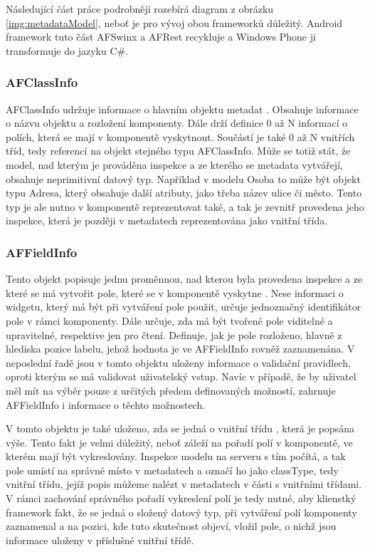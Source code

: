 Následující část práce podrobněji rozebírá diagram z obrázku \ref{img:metadataModel}, neboť je pro vývoj obou frameworků důležitý. Android framework tuto část AFSwinx a AFRest recykluje a Windows Phone ji transformuje do jazyku C\#.
\subsubsection{AFClassInfo}
AFClassInfo udržuje informace o hlavním objektu metadat \cite{tomasek-thesis}. Obsahuje informace o názvu objektu a rozložení komponenty. Dále drží definice 0 až N informací o polích, která se mají v komponentě vyskytnout. Součástí je také 0 až N vnitřích tříd, tedy referencí na objekt stejného typu AFClassInfo. Může se totiž stát, že model, nad kterým je prováděna inspekce a ze kterého se metadata vytvářejí, obsahuje neprimitivní datový typ. Například v modelu Osoba to může být objekt typu Adresa, který obsahuje další atributy, jako třeba název ulice či město. Tento typ je ale nutno v komponentě reprezentovat také, a tak je zevnitř provedena jeho inspekce, která je později v metadatech reprezentována jako vnitřní třída. 

\subsubsection{AFFieldInfo}
Tento objekt popisuje jednu proměnnou, nad kterou byla provedena inspekce a ze které se má vytvořit pole, které se v komponentě vyskytne \cite{tomasek-thesis}. Nese informaci o widgetu, který má být při vytváření pole použit, určuje jednoznačný identifikátor pole v rámci komponenty. Dále určuje, zda má být tvořené pole viditelné a upravitelné, respektive jen pro čtení. Definuje, jak je pole rozloženo, hlavně z hlediska pozice labelu, jehož hodnota je ve AFFieldInfo rovněž zaznamenána. V neposlední řadě jsou v tomto objektu uloženy informace o validační pravidlech, oproti kterým se má validovat uživatelský vstup. Navíc v případě, že by uživatel měl mít na výběr pouze z určitých předem definovaných možností, zahrnuje AFFieldInfo i informace o těchto možnostech. 

V tomto objektu je také uloženo, zda se jedná o vnitřní třídu \cite{tomasek-thesis}, která je popsána výše. Tento fakt je velmi důležitý, neboť záleží na pořadí polí v komponentě, ve kterém mají být vykreslovány. Inspekce modelu na serveru s tím počítá, a tak pole umístí na správné místo v metadatech a označí ho jako classType, tedy vnitřní třídu, jejíž popis můžeme nalézt v metadatech v části s vnitřními třídami. V rámci zachování správného pořadí vykreslení polí je tedy nutné, aby klienstký framework fakt, že se jedná o složený datový typ, při vytváření polí komponenty zaznamenal a na pozici, kde tuto skutečnost objeví, vložil pole, o nichž jsou informace uloženy v příslušné vnitřní třídě.

